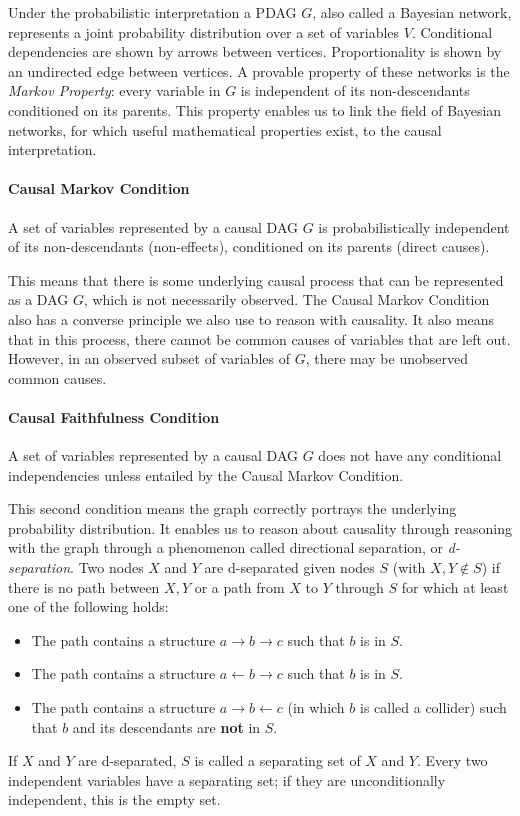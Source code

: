 \documentclass[a4paper, 10pt, english, onecolumn]{article}
\begin{document}
Under the probabilistic interpretation a PDAG $G$, also called a Bayesian network, represents a joint probability distribution over a set of variables $V$.
Conditional dependencies are shown by arrows between vertices.
Proportionality is shown by an undirected edge between vertices.
A provable property of these networks is the \textit{Markov Property}: every variable in $G$ is independent of its non-descendants conditioned on its parents.
This property enables us to link the field of Bayesian networks, for which useful mathematical properties exist, to the causal interpretation.

\paragraph{Causal Markov Condition}
A set of variables represented by a causal DAG $G$ is probabilistically independent of its non-descendants (non-effects), conditioned on its parents (direct causes).

This means that there is some underlying causal process that can be represented as a DAG $G$, which is not necessarily observed.
The Causal Markov Condition also has a converse principle we also use to reason with causality.
It also means that in this process, there cannot be common causes of variables that are left out.
However, in an observed subset of variables of $G$, there may be unobserved common causes.

\paragraph{Causal Faithfulness Condition}
A set of variables represented by a causal DAG $G$ does not have any conditional independencies unless entailed by the Causal Markov Condition.

This second condition means the graph correctly portrays the underlying probability distribution.
It enables us to reason about causality through reasoning with the graph through a phenomenon called directional separation, or \textit{d-separation}.
Two nodes $X$ and $Y$ are d-separated given nodes $S$ (with $X, Y \notin S$) if there is no path between $X,Y$ or a path from $X$ to $Y$ through $S$ for which at least one of the following holds:
\begin{itemize}
\item The path contains a structure $a \rightarrow b \rightarrow c$ such that $b$ is in $S$.
\item The path contains a structure $a \leftarrow b \rightarrow c$ such that $b$ is in $S$.
\item The path contains a structure $a \rightarrow b \leftarrow c$ (in which $b$ is called a collider) such that $b$ and its descendants are \textbf{not} in $S$.
\end{itemize}
If $X$ and $Y$ are d-separated, $S$ is called a separating set of $X$ and $Y$. Every two independent variables have a separating set; if they are unconditionally independent, this is the empty  set.
\end{document}
